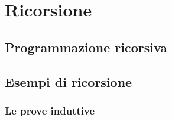 \chapter{Ricorsione}

\section{Programmazione ricorsiva}

\section{Esempi di ricorsione}

\subsection{Le prove induttive}
